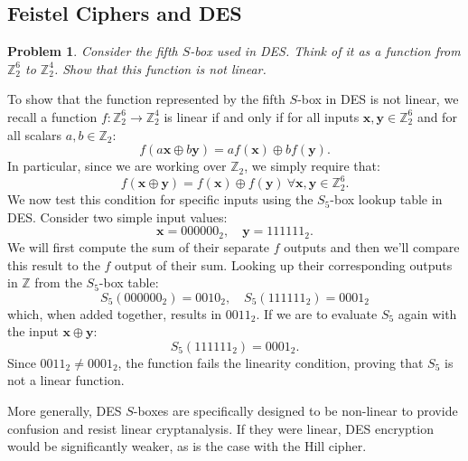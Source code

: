 \documentclass[12pt]{article}
\newenvironment{answer}
    {\begin{adjustwidth}{0pt}{0pt}}
    {\end{adjustwidth}}
\newtheorem{problem}{Problem}
\theoremstyle{remark}  %
\begin{document}
\subsection{Feistel Ciphers and DES}
\setcounter{problem}{0}
\begin{problem}
    Consider the fifth $S$-box used in DES. Think of it as a function from $\mathbb{Z}_2^6$ to $\mathbb{Z}_2^4$. Show that this function is not linear.
\end{problem}
\begin{answer}
    To show that the function represented by the fifth $S$-box in DES is not linear, we recall a function $f: \mathbb{Z}_2^6 \to \mathbb{Z}_2^4$ is linear if and only if for all inputs $\mathbf{x}, \mathbf{y} \in \mathbb{Z}_2^6$ and for all scalars $a, b \in \mathbb{Z}_2$: $$
        f(a\mathbf{x} \oplus b\mathbf{y}) = a f(\mathbf{x}) \oplus b f(\mathbf{y}).
    $$
    In particular, since we are working over $\mathbb{Z}_2$, we simply require that: $$
        f(\mathbf{x} \oplus \mathbf{y}) = f(\mathbf{x}) \oplus f(\mathbf{y}) \ \forall \mathbf{x}, \mathbf{y} \in \mathbb{Z}_2^6.
    $$ We now test this condition for specific inputs using the $S_5$-box lookup table in DES. Consider two simple input values: $$
        \mathbf{x} = 000000_2, \quad \mathbf{y} = 111111_2.
    $$
    We will first compute the sum of their separate $f$ outputs and then we'll compare this result to the $f$ output of their sum. Looking up their corresponding outputs in $\mathbb{Z}$ from the $S_5$-box table: $$
        S_5(000000_2) = 0010_2, \quad S_5(111111_2) = 0001_2
    $$
    which, when added together, results in $0011_2$.
    If we are to evaluate $S_5$ again with the input $\mathbf{x}\oplus\mathbf{y}$: $$
        S_5(111111_2) = 0001_2.
    $$ Since $0011_2 \neq 0001_2$,
    the function fails the linearity condition, proving that $S_5$ is not a linear function.

    More generally, DES $S$-boxes are specifically designed to be non-linear to provide confusion and resist linear cryptanalysis. If they were linear, DES encryption would be significantly weaker, as is the case with the Hill cipher.
\end{answer}

\iffalse


\end{document}
